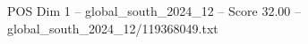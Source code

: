 \begin{textsample}{POS Dim 1 – global\_south\_2024\_12 – Score 32.00 – global\_south\_2024\_12/119368049.txt}
\end{textsample}
